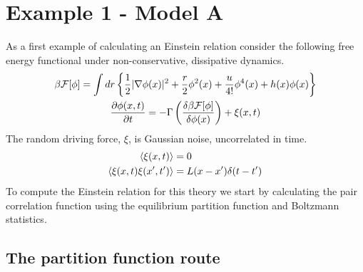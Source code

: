 \section{Example 1 - Model A} %

As a first example of calculating an Einstein relation consider the following
free energy functional under non-conservative, dissipative dynamics.
%
\begin{gather} \beta \mathcal{F}[\phi] = \int dr \left\lbrace \frac{1}{2}\vert \nabla
    \phi(x) \vert^2 + \frac{r}{2}\phi^2(x) + \frac{u}{4!}\phi^4(x)  +
    h(x)\phi(x)\right\rbrace \\ \frac{\partial \phi(x,t)}{\partial t} = -\Gamma
    \left(\frac{\delta \beta \mathcal{F}[\phi]}{\delta \phi(x)}\right) + \xi(x, t)
\end{gather}
%
The random driving force, $\xi$, is Gaussian noise, uncorrelated in time.
%
\begin{align} \left\langle \xi (x, t) \right\rangle &= 0 \\ \left\langle \xi (x, t)
\xi(x^\prime, t^\prime) \right\rangle  &= L(x-x^\prime) \delta (t - t^\prime)
\end{align}
%
To compute the Einstein relation for this theory we start by calculating the
pair correlation function using the equilibrium partition function and
Boltzmann statistics.

\subsection{The partition function route}

